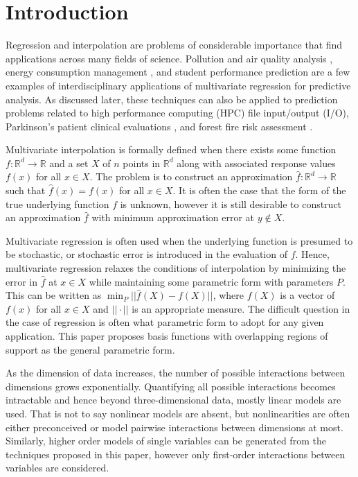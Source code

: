 \def\mn#1{\left\Vert #1\right\Vert_\infty} 
\section{Introduction}
\label{sec_introduction}

Regression and interpolation are problems of considerable importance that find applications across many fields of science. Pollution and air quality analysis \cite{de2008field}, energy consumption management \cite{lazos2014optimisation}, and student performance prediction \cite{cortez2008using} are a few examples of interdisciplinary applications of multivariate regression for predictive analysis. As discussed later, these techniques can also be applied to prediction problems related to high performance computing (HPC) file input/output (I/O), Parkinson's patient clinical evaluations \cite{tsanas2010accurate}, and forest fire risk assessment \cite{cortez2007data}.

Multivariate interpolation is formally defined when there exists some function $f:\mathbb{R}^d \rightarrow \mathbb{R}$ and a set $X$ of $n$ points in $\mathbb{R}^d$ along with associated response values $f(x)$ for all $x \in X$. The problem is to construct an approximation $\hat f: \mathbb{R}^d \rightarrow \mathbb{R}$ such that $\hat f(x) = f(x)$ for all $x \in X$. It is often the case that the form of the true underlying function $f$ is unknown, however it is still desirable to construct an approximation $\hat f$ with minimum approximation error at $y \notin X$.

Multivariate regression is often used when the underlying function is presumed to be stochastic, or stochastic error is introduced in the evaluation of $f$. Hence, multivariate regression relaxes the conditions of interpolation by minimizing the error in $\hat f$ at $x \in X$ while maintaining some parametric form with parameters $P$. This can be written as $\min_{P} ||\hat f(X) - f(X)||$, where $f(X)$ is a vector of $f(x)$ for all $x \in X$ and $||\cdot||$ is an appropriate measure. The difficult question in the case of regression is often what parametric form to adopt for any given application. This paper proposes basis functions with overlapping regions of support as the general parametric form.

As the dimension of data increases, the number of possible interactions between dimensions grows exponentially. Quantifying all possible interactions becomes intractable and hence beyond three-dimensional data, mostly linear models are used. That is not to say nonlinear models are absent, but nonlinearities are often either preconceived or model pairwise interactions between dimensions at most. Similarly, higher order models of single variables can be generated from the techniques proposed in this paper, however only first-order interactions between variables are considered.

